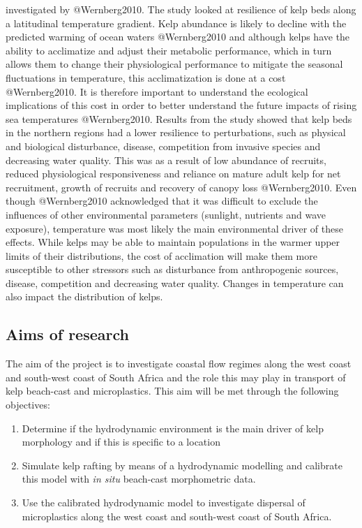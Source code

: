 \documentclass[]{article}
\providecommand{\tightlist}{%
  \setlength{\itemsep}{0pt}\setlength{\parskip}{0pt}}
\begin{document}
investigated by @Wernberg2010. The study looked at resilience of kelp
beds along a latitudinal temperature gradient. Kelp abundance is likely
to decline with the predicted warming of ocean waters @Wernberg2010 and
although kelps have the ability to acclimatize and adjust their
metabolic performance, which in turn allows them to change their
physiological performance to mitigate the seasonal ﬂuctuations in
temperature, this acclimatization is done at a cost @Wernberg2010. It is
therefore important to understand the ecological implications of this
cost in order to better understand the future impacts of rising sea
temperatures @Wernberg2010. Results from the study showed that kelp beds
in the northern regions had a lower resilience to perturbations, such as
physical and biological disturbance, disease, competition from invasive
species and decreasing water quality. This was as a result of low
abundance of recruits, reduced physiological responsiveness and reliance
on mature adult kelp for net recruitment, growth of recruits and
recovery of canopy loss @Wernberg2010. Even though @Wernberg2010
acknowledged that it was diﬃcult to exclude the inﬂuences of other
environmental parameters (sunlight, nutrients and wave exposure),
temperature was most likely the main environmental driver of these
eﬀects. While kelps may be able to maintain populations in the warmer
upper limits of their distributions, the cost of acclimation will make
them more susceptible to other stressors such as disturbance from
anthropogenic sources, disease, competition and decreasing water
quality. Changes in temperature can also impact the distribution of
kelps.

\subsection{Aims of research}\label{aims-of-research}

The aim of the project is to investigate coastal flow regimes along the
west coast and south-west coast of South Africa and the role this may
play in transport of kelp beach-cast and microplastics. This aim will be
met through the following objectives:

\begin{enumerate}
\def\labelenumi{\Alph{enumi})}
\tightlist
\item
  Determine if the hydrodynamic environment is the main driver of kelp
  morphology and if this is specific to a location
\item
  Simulate kelp rafting by means of a hydrodynamic modelling and
  calibrate this model with \emph{in situ} beach-cast morphometric data.
\item
  Use the calibrated hydrodynamic model to investigate dispersal of
  microplastics along the west coast and south-west coast of South
  Africa.
\end{enumerate}
\end{document}
